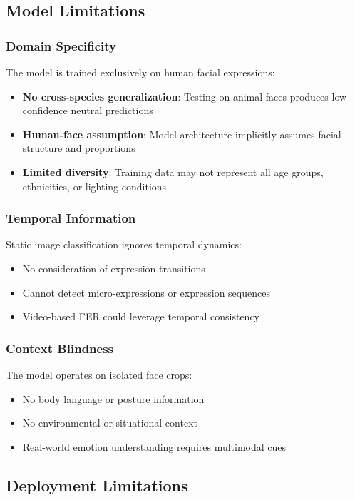 \documentclass[12pt,a4paper]{article}
\begin{document}
\subsection{Model Limitations}

\subsubsection{Domain Specificity}
The model is trained exclusively on human facial expressions:
\begin{itemize}[leftmargin=*]
    \item \textbf{No cross-species generalization}: Testing on animal faces produces low-confidence neutral predictions
    \item \textbf{Human-face assumption}: Model architecture implicitly assumes facial structure and proportions
    \item \textbf{Limited diversity}: Training data may not represent all age groups, ethnicities, or lighting conditions
\end{itemize}

\subsubsection{Temporal Information}
Static image classification ignores temporal dynamics:
\begin{itemize}[leftmargin=*]
    \item No consideration of expression transitions
    \item Cannot detect micro-expressions or expression sequences
    \item Video-based FER could leverage temporal consistency
\end{itemize}

\subsubsection{Context Blindness}
The model operates on isolated face crops:
\begin{itemize}[leftmargin=*]
    \item No body language or posture information
    \item No environmental or situational context
    \item Real-world emotion understanding requires multimodal cues
\end{itemize}

\subsection{Deployment Limitations}
\end{document}
